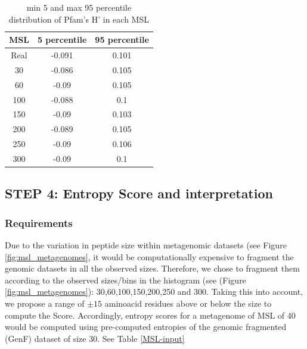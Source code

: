 \documentclass[12pt]{report}
\begin{document}
\begin{enumerate}
\begin{enumerate}
\begin{table}[H]
\centering
\caption{min 5 and max 95 percentile distribution of Pfam's H' in each MSL}
\label{percent}
\begin{tabular}{@{}ccc@{}}
\toprule
MSL  & 5 percentile & 95 percentile \\ \midrule
Real & -0.091       & 0.101         \\
30   & -0.086       & 0.105         \\
60   & -0.09        & 0.105         \\
100  & -0.088       & 0.1           \\
150  & -0.09        & 0.103         \\
200  & -0.089       & 0.105         \\
250  & -0.09        & 0.106         \\
300  & -0.09        & 0.1             \\ \bottomrule
\end{tabular}
\end{table}



\end{enumerate}
\end{enumerate}

\subsection{STEP 4: Entropy Score and interpretation}
\label{Step4}
\subsubsection{Requirements}
Due to the variation in peptide size within metagenomic datasets (see
Figure \ref{fig:msl_metagenomes}, it would be computationally expensive to fragment the genomic datasets in all the observed sizes. Therefore, we chose to fragment them according to the observed sizes/bins in the histogram (see (Figure \ref{fig:msl_metagenomes}):
30,60,100,150,200,250 and 300. Taking this into
account, we propose a range of $\pm 15$ aminoacid residues above or below the size to
compute the Score. Accordingly, entropy scores for a metagenome of MSL of 40 would be computed using pre-computed entropies of the genomic fragmented (GenF) dataset
of size 30. See Table \ref{MSL-input}
\end{document}
